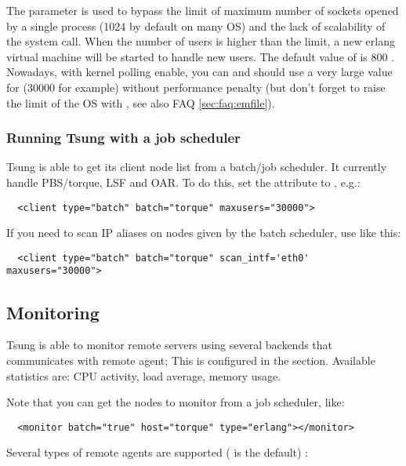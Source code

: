 \documentclass{TSUNG-en}
\begin{document}
 The  parameter is used to bypass the limit of
 maximum number of sockets opened by a single process (1024 by
 default on many OS)
 and the lack of scalability of the  system call. When
 the number of users is higher than the limit, a new erlang virtual
 machine will be started to handle new users. The default value of
  is 800 . Nowadays, with kernel polling enable, you
 can and should use a very large value for  (30000 for example) without
 performance penalty (but don't forget to raise the limit of the OS with
 , see also FAQ \ref{sec:faq:emfile}).

\subsubsection{Running Tsung with a job scheduler}

Tsung is able to get its client node list from a batch/job
scheduler. It currently handle PBS/torque, LSF and OAR. To do this,
 set the  attribute to , e.g.:

\begin{Verbatim}
  <client type="batch" batch="torque" maxusers="30000">
\end{Verbatim}

If you need to scan IP aliases on nodes given by the batch scheduler,
use  like this:
\begin{Verbatim}
  <client type="batch" batch="torque" scan_intf='eth0'  maxusers="30000">
\end{Verbatim}

\subsection{Monitoring}

Tsung is able to monitor remote servers using several backends that
communicates with remote agent; This
is configured in the  section. Available
statistics are: CPU activity, load average, memory usage.

Note that you can get the nodes to monitor from a job scheduler, like:
\begin{Verbatim}
  <monitor batch="true" host="torque" type="erlang"></monitor>
\end{Verbatim}


Several types of remote agents are supported ( is the default) :
\end{document}
